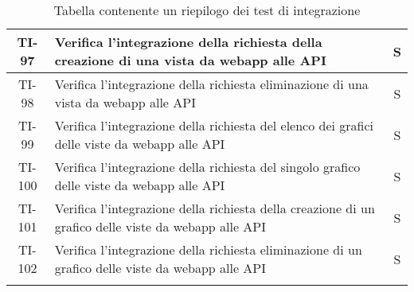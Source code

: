 \begin{center}
\begin{longtable}{|c|p{12cm}|c|}
			\hline
			TI-97 & Verifica l'integrazione della richiesta della creazione di una vista da webapp alle API & S \\
			\hline
			TI-98 & Verifica l'integrazione della richiesta eliminazione di una vista da webapp alle API & S \\
			\hline
			TI-99 & Verifica l'integrazione della richiesta del elenco dei grafici delle viste da webapp alle API & S \\
			\hline
			TI-100 & Verifica l'integrazione della richiesta del singolo grafico delle viste da webapp alle API & S \\
			\hline
			TI-101 & Verifica l'integrazione della richiesta della creazione di un grafico delle viste da webapp alle API & S \\
			\hline
			TI-102 & Verifica l'integrazione della richiesta eliminazione di un grafico delle viste da webapp alle API & S \\
			\hline
			 
			\caption{Tabella contenente un riepilogo dei test di integrazione}
			\end{longtable}
		\end{center}
	
